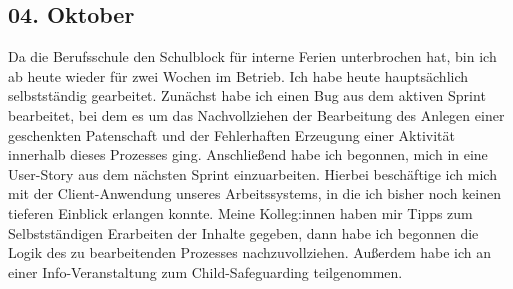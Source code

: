 \subsection{04. Oktober}
Da die Berufsschule den Schulblock für interne Ferien unterbrochen hat, bin ich ab heute wieder für zwei Wochen im Betrieb. Ich habe heute hauptsächlich selbstständig gearbeitet. Zunächst habe ich einen Bug aus dem aktiven Sprint bearbeitet, bei dem es um das Nachvollziehen der Bearbeitung des Anlegen einer geschenkten Patenschaft und der Fehlerhaften Erzeugung einer Aktivität innerhalb dieses Prozesses ging. Anschließend habe ich begonnen, mich in eine User-Story aus dem nächsten Sprint einzuarbeiten. Hierbei beschäftige ich mich mit der Client-Anwendung unseres Arbeitssystems, in die ich bisher noch keinen tieferen Einblick erlangen konnte. Meine Kolleg:innen haben mir Tipps zum Selbstständigen Erarbeiten der Inhalte gegeben, dann habe ich begonnen die Logik des zu bearbeitenden Prozesses nachzuvollziehen. Außerdem habe ich an einer Info-Veranstaltung zum Child-Safeguarding teilgenommen.